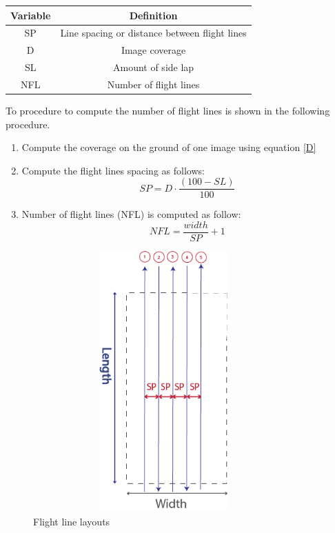 \begin{table}[H]
\centering
\begin{tabular}{|c|c|}
\hline
\textbf{Variable} & \textbf{Definition}                           \\ \hline
SP                & Line spacing or distance between flight lines \\ \hline
D                 & Image coverage                                \\ \hline
SL                & Amount of side lap                            \\ \hline
NFL               & Number of flight lines                        \\ \hline
\end{tabular}
\label{Flight line amount equation variable definition}
\end{table}
To procedure to compute the number of flight lines is shown in the following procedure.
\begin{enumerate}
\item Compute the coverage on the ground of one image using equation \ref{D}
\item Compute the flight lines spacing as follows:
\begin{equation}
SP = D\cdot \frac{(100-SL)}{100}
\end{equation}
\item Number of flight lines (NFL) is computed as follow:
\begin{equation}
NFL=\frac{width}{SP}+1
\end{equation}
\end{enumerate}
\begin{figure}[H]
\centering
\includegraphics[width=10cm,height=10cm,keepaspectratio]{imagenes/Line_layout.png}
\caption {Flight line layouts}
\label{fig:flight_lines}
\end{figure}

